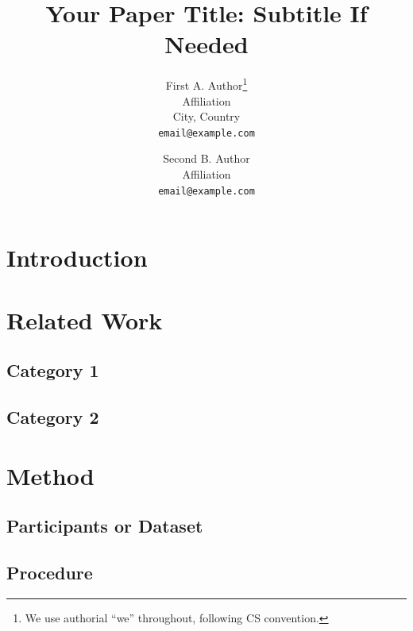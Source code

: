 \documentclass[11pt]{article}
\title{Your Paper Title: Subtitle If Needed}
\author{%
  First A. Author\thanks{We use authorial ``we'' throughout, following CS convention.} \\
  Affiliation \\
  City, Country \\
  \texttt{email@example.com}
  \and
  Second B. Author \\
  Affiliation \\
  \texttt{email@example.com}
}
\date{}
\begin{document}
\maketitle

\begin{abstract}
\end{abstract}

\section{Introduction}

\section{Related Work}

\subsection{Category 1}

\subsection{Category 2}

\section{Method}

\subsection{Participants or Dataset}

\subsection{Procedure}
\end{document}
